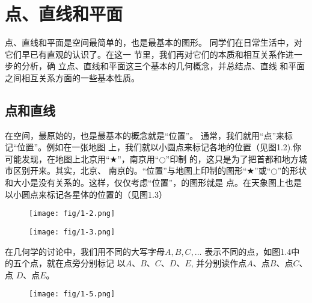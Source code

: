 \section{点、直线和平面}
点、直线和平面是空间最简单的，也是最基本的图形。
同学们在日常生活中，对它们早已有直观的认识了。在这一
节里，我们再对它们的本质和相互关系作进一步的分析，确
立点、直线和平面这三个基本的几何概念，并总结点、直线
和平面之间相互关系方面的一些基本性质。

\subsection{点和直线}
在空间，最原始的，也是最基本的概念就是“位置”。
通常，我们就用“点”来标记“位置”。例如在一张地图
上，我们就以小圆点来标记各地的位置（见图1.2).你
可能发现，在地图上北京用“$\bigstar$”，南京用“$\bigcirc$”印制
的，这只是为了把首都和地方城市区别开来。其实，北京、
南京的。“位置”与地图上印制的图形“$\bigstar$”或“$\bigcirc$”的形状
和大小是没有关系的。这样，仅仅考虑“位置”，的图形就是
点。在天象图上也是以小圆点来标记各星体的位置的（见图1.3）

\begin{figure}[htp]\centering
    \begin{minipage}[t]{0.48\textwidth}
    \centering
\texttt{[image: fig/1-2.png]}
    \caption{}
    \end{minipage}
    \begin{minipage}[t]{0.48\textwidth}
    \centering
	\texttt{[image: fig/1-3.png]}
    \caption{}
    \end{minipage}
    \end{figure}



在几何学的讨论中，我们用不同的大写字母$A,B,C,\ldots$
表示不同的点，如图1.4中的五个点，就在点旁分别标记
以$A$、$B$、$C$、$D$、$E$, 并分别读作点$A$、点$B$、点$C$、点
$D$、点$E$。

\begin{figure}[htp]\centering
    \begin{minipage}[t]{0.48\textwidth}
    \centering
{}
    \caption{}
    \end{minipage}
    \begin{minipage}[t]{0.48\textwidth}
    \centering
      \texttt{[image: fig/1-5.png]}
    \caption{}
    \end{minipage}
    \end{figure}


